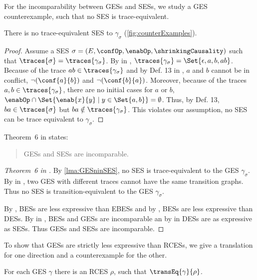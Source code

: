 \documentclass[runningheads,a4paper]{llncs}
\begin{document}
For the incomparability between GESs and SESs, we study a GES counterexample, such that no SES is trace-equivalent.
\begin{lemma}\label{lma:GESninSES}
There is no trace-equivalent SES to $\gamma_\sigma$ (\cf \fig\ref{fig:counterExamples}).
\end{lemma}
\begin{proof}
	Assume a SES $ \sigma = \left( E, \confOp, \enabOp, \shrinkingCausality \right) $ such that $ \traces{\sigma} = \traces{\gamma_\sigma} $.	By  in \cite{dynamicCausality15}, $ \traces{\gamma_\sigma} = \Set{ \epsilon, a, b, ab } $.	Because of the trace $ ab \in \traces{\gamma_\sigma} $ and by Def. 13 in \cite{dynamicCausality15}, $ a $ and $ b $ cannot be in conflict, \ie $ \neg (\conf{a}{b} ) $ and $ \neg ( \conf{b}{a} ) $.	Moreover, because of the traces $ a, b \in \traces{\gamma_\sigma} $, there are no initial cases for $ a $ or $ b $, \ie $ \enabOp \cap \Set{ \enab{x}{y} \mid y \in \Set{ a, b } } = \emptyset $.	Thus, by Def. 13, $ ba \in \traces{\sigma} $ but $ ba \notin \traces{\gamma_\sigma} $.	This violates our assumption, \ie no SES can be trace equivalent to $	\gamma_\sigma $.
\end{proof}
Theorem~6 in \cite{dynamicCausality15} states:
\begin{quote}
	GESs and SESs are incomparable.
\end{quote}
\begin{proof}[Theorem~6 in \cite{dynamicCausality15}]
	By \lem\ref{lma:GESninSES}, no SES is trace-equivalent to the GES $ \gamma_\sigma $. By  in \cite{dynamicCausality15}, two GES with different traces cannot have the same transition graphs. Thus no SES is transition-equivalent to the GES $ \gamma_\sigma $.
	
	By \cite{Langerak:Thesis}, BESs are less expressive than EBESs and by \cite{Langerak97causalambiguity}, BESs are less expressive than DESs.	By  in \cite{dynamicCausality15}, BESs and GESs are incomparable an by  in \cite{dynamicCausality15} DESs are as expressive as SESs.	Thus GESs and SESs are incomparable.
\end{proof}
To show that GESs are strictly less expressive than RCESs, we give a translation
for one direction and a counterexample for the other.
\begin{lemma}\label{lma:GESinRCES}
	For each GES $ \gamma $ there is an RCES $ \rho $, such that $ \transEq{\gamma }{ \rho} $.
\end{lemma}
\end{document}
